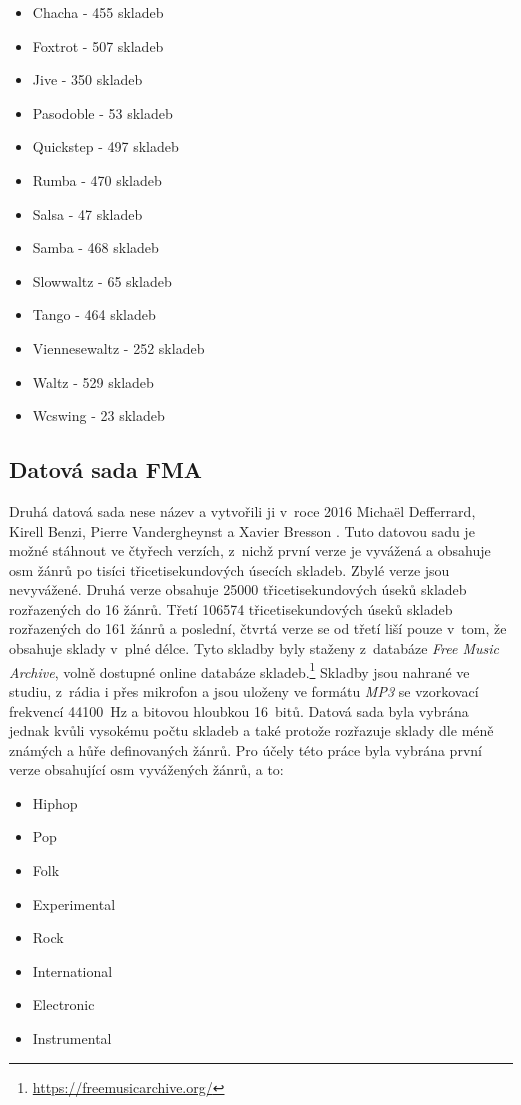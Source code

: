 \begin{itemize}
    \item Chacha - 455 skladeb
    \item Foxtrot - 507 skladeb
    \item Jive - 350 skladeb
    \item Pasodoble - 53 skladeb
    \item Quickstep - 497 skladeb
    \item Rumba - 470 skladeb
    \item Salsa - 47 skladeb
    \item Samba - 468 skladeb
    \item Slowwaltz - 65 skladeb
    \item Tango - 464 skladeb
    \item Viennesewaltz - 252 skladeb
    \item Waltz - 529 skladeb
    \item Wcswing - 23 skladeb
\end{itemize}

\subsection*{Datová sada FMA}
Druhá datová sada nese název  a vytvořili ji v~roce 2016 Michaël Defferrard, Kirell Benzi, Pierre Vandergheynst a Xavier Bresson \cite{fma_dataset}. Tuto datovou sadu je možné stáhnout ve čtyřech verzích, z~nichž první verze je vyvážená a obsahuje osm žánrů po tisíci třicetisekundových úsecích skladeb. Zbylé verze jsou nevyvážené. Druhá verze obsahuje 25000 třicetisekundových úseků skladeb rozřazených do 16
žánrů. Třetí 106574 třicetisekundových úseků skladeb rozřazených do 161 žánrů a poslední, čtvrtá verze se od třetí liší pouze v~tom, že obsahuje sklady v~plné délce. Tyto skladby byly staženy z~databáze \textit{Free Music Archive}, volně dostupné online databáze skladeb.\footnote{\url{https://freemusicarchive.org/}} Skladby jsou  nahrané ve studiu, z~rádia i přes mikrofon a jsou uloženy ve formátu \textit{MP3} se vzorkovací frekvencí 44100~Hz a bitovou hloubkou 16~bitů. Datová sada byla vybrána jednak kvůli vysokému počtu skladeb a také protože rozřazuje sklady dle méně známých a hůře definovaných žánrů. Pro účely této práce byla vybrána první verze obsahující osm vyvážených žánrů, a to:

\begin{itemize}
    \item Hiphop
    \item Pop
    \item Folk
    \item Experimental
    \item Rock
    \item International
    \item Electronic
    \item Instrumental
\end{itemize}

